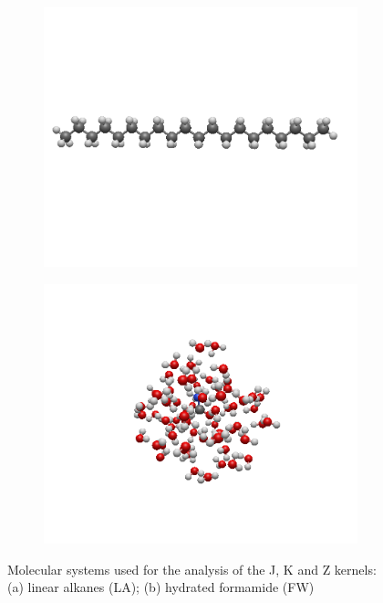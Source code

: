 \begin{figure}
     \centering
     \begin{subfigure}{0.4\textwidth}
         \centering
         \includegraphics[width=\textwidth]{Pics/alkan.png}
         \caption{}
     \end{subfigure}
	\begin{subfigure}{0.5\textwidth}
         \centering
         \includegraphics[width=\textwidth]{Pics/FW63.png}
         \caption{}
         \label{fig:five over x}
     \end{subfigure}
     	\caption[Molecular systems used for the analysis of the J, K and Z kernels.]{Molecular systems used for the analysis of the J, K and Z kernels: (a) linear alkanes (LA); (b) hydrated formamide (FW)}
        \label{fig:GS_MOL}
\end{figure}


